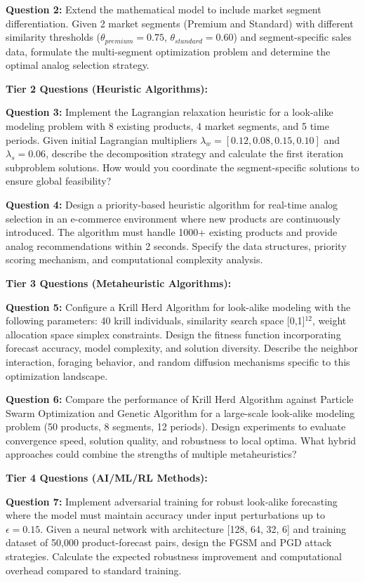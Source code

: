 \documentclass{article}
\begin{document}
\textbf{Question 2:} Extend the mathematical model to include market segment differentiation. Given 2 market segments (Premium and Standard) with different similarity thresholds ($\theta_{premium} = 0.75$, $\theta_{standard} = 0.60$) and segment-specific sales data, formulate the multi-segment optimization problem and determine the optimal analog selection strategy.

\textbf{Tier 2 Questions (Heuristic Algorithms):}

\textbf{Question 3:} Implement the Lagrangian relaxation heuristic for a look-alike modeling problem with 8 existing products, 4 market segments, and 5 time periods. Given initial Lagrangian multipliers $\lambda_w = [0.12, 0.08, 0.15, 0.10]$ and $\lambda_s = 0.06$, describe the decomposition strategy and calculate the first iteration subproblem solutions. How would you coordinate the segment-specific solutions to ensure global feasibility?

\textbf{Question 4:} Design a priority-based heuristic algorithm for real-time analog selection in an e-commerce environment where new products are continuously introduced. The algorithm must handle 1000+ existing products and provide analog recommendations within 2 seconds. Specify the data structures, priority scoring mechanism, and computational complexity analysis.

\textbf{Tier 3 Questions (Metaheuristic Algorithms):}

\textbf{Question 5:} Configure a Krill Herd Algorithm for look-alike modeling with the following parameters: 40 krill individuals, similarity search space [0,1]$^{12}$, weight allocation space simplex constraints. Design the fitness function incorporating forecast accuracy, model complexity, and solution diversity. Describe the neighbor interaction, foraging behavior, and random diffusion mechanisms specific to this optimization landscape.

\textbf{Question 6:} Compare the performance of Krill Herd Algorithm against Particle Swarm Optimization and Genetic Algorithm for a large-scale look-alike modeling problem (50 products, 8 segments, 12 periods). Design experiments to evaluate convergence speed, solution quality, and robustness to local optima. What hybrid approaches could combine the strengths of multiple metaheuristics?

\textbf{Tier 4 Questions (AI/ML/RL Methods):}

\textbf{Question 7:} Implement adversarial training for robust look-alike forecasting where the model must maintain accuracy under input perturbations up to $\epsilon = 0.15$. Given a neural network with architecture [128, 64, 32, 6] and training dataset of 50,000 product-forecast pairs, design the FGSM and PGD attack strategies. Calculate the expected robustness improvement and computational overhead compared to standard training.
\end{document}

